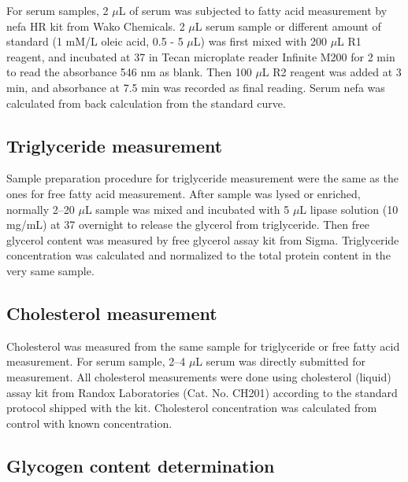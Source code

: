 For serum samples, 2 $\mu$L of serum was subjected to fatty acid measurement by \gls{nefa} HR kit from Wako Chemicals. 2 $\mu$L serum sample or different amount of standard (1 mM/L oleic acid, 0.5 - 5 $\mu$L) was first mixed with 200 $\mu$L R1 reagent, and incubated at 37 \celsius{} in Tecan microplate reader Infinite M200 for 2 min to read the absorbance 546 nm as blank. Then 100 $\mu$L R2 reagent was added at 3 min, and absorbance at 7.5 min was recorded as final reading. Serum \gls{nefa} was calculated from back calculation from the standard curve.

\subsection{Triglyceride measurement}

Sample preparation procedure for triglyceride measurement were the same as the ones for free fatty acid measurement. After sample was lysed or enriched, normally 2--20 $\mu$L sample was mixed and incubated with 5 $\mu$L lipase solution (10 mg/mL) at 37 \celsius{} overnight to release the glycerol from triglyceride. Then free glycerol content was measured by free glycerol assay kit from Sigma. Triglyceride concentration was calculated and normalized to the total protein content in the very same sample.


\subsection{Cholesterol measurement}

Cholesterol was measured from the same sample for triglyceride or free fatty acid measurement. For serum sample, 2--4 $\mu$L serum was directly submitted for measurement. All cholesterol measurements were done using cholesterol (liquid) assay kit from Randox Laboratories (Cat. No. CH201) according to the standard protocol shipped with the kit. Cholesterol concentration was calculated from control with known concentration.
	

\subsection{Glycogen content determination}

